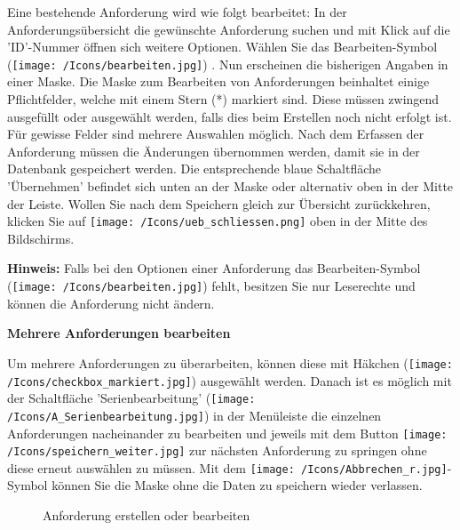 Eine bestehende Anforderung wird wie folgt bearbeitet: In der Anforderungsübersicht die gewünschte Anforderung suchen und mit Klick auf die 'ID'-Nummer  öffnen sich weitere Optionen. Wählen Sie das Bearbeiten-Symbol (\texttt{[image: /Icons/bearbeiten.jpg]}) . Nun erscheinen die bisherigen Angaben in einer Maske. Die Maske zum Bearbeiten von Anforderungen beinhaltet einige Pflichtfelder, welche mit einem Stern (*) markiert sind. Diese müssen zwingend ausgefüllt oder ausgewählt werden, falls dies beim Erstellen noch nicht erfolgt ist. Für gewisse Felder sind mehrere Auswahlen möglich. Nach dem Erfassen der Anforderung müssen die Änderungen übernommen werden, damit sie in der Datenbank gespeichert werden. Die entsprechende blaue Schaltfläche 'Übernehmen' befindet sich unten an der Maske oder alternativ oben in der Mitte der Leiste. Wollen Sie nach dem Speichern gleich zur Übersicht zurückkehren, klicken Sie auf \texttt{[image: /Icons/ueb\_schliessen.png]} oben in der Mitte des Bildschirms. \\

\vspace{\baselineskip}

\textbf{Hinweis:} Falls bei den Optionen einer Anforderung das Bearbeiten-Symbol (\texttt{[image: /Icons/bearbeiten.jpg]}) fehlt, besitzen Sie nur Leserechte und können die Anforderung nicht ändern.

\vspace{\baselineskip}

\textbf{Mehrere Anforderungen bearbeiten}

Um mehrere Anforderungen zu überarbeiten, können diese mit Häkchen (\texttt{[image: /Icons/checkbox\_markiert.jpg]}) ausgewählt werden. Danach ist es möglich mit der Schaltfläche 'Serienbearbeitung' (\texttt{[image: /Icons/A\_Serienbearbeitung.jpg]}) in der Menüleiste die einzelnen Anforderungen nacheinander zu bearbeiten und jeweils mit dem Button \texttt{[image: /Icons/speichern\_weiter.jpg]}  zur nächsten Anforderung zu springen ohne diese erneut auswählen zu müssen. Mit dem \texttt{[image: /Icons/Abbrechen\_r.jpg]}-Symbol  können Sie die Maske ohne die Daten zu speichern wieder verlassen. \\

\begin{figure}[H]
\caption{Anforderung erstellen oder bearbeiten}
\end{figure}

